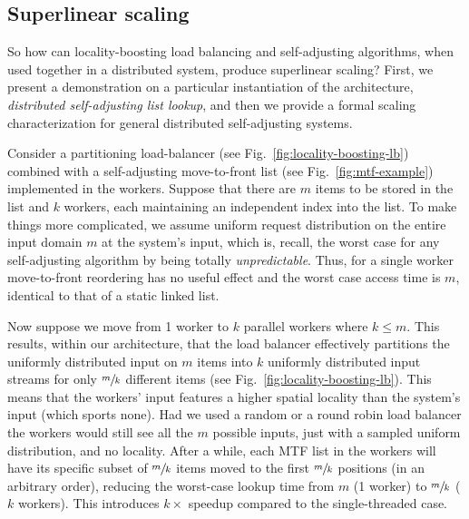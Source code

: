
\subsection{Superlinear scaling}
\label{sec:arch-scaling}

So how can locality-boosting load balancing and self-adjusting algorithms, when used together in a distributed system, produce superlinear scaling? First, we present a demonstration on a particular instantiation of the architecture, \emph{distributed self-adjusting list lookup}, and then we provide a formal scaling characterization for general distributed self-adjusting systems.

Consider a partitioning load-balancer (see Fig.~\ref{fig:locality-boosting-lb}) combined with a self-adjusting move-to-front list (see Fig.~\ref{fig:mtf-example}) implemented in the workers. Suppose that there are $m$ items to be stored in the list and $k$ workers, each maintaining an independent index into the list. To make things more complicated, we assume uniform request distribution on the entire input domain $m$ at the system's input, which is, recall, the worst case for any self-adjusting algorithm by being totally \emph{unpredictable}. Thus, for a single worker move-to-front reordering has no useful effect and the worst case access time is $m$, identical to that of a static linked list.

Now suppose we move from 1 worker to $k$ parallel workers where $k \le m$. This results, within our architecture, that the load balancer effectively partitions the uniformly distributed input on $m$ items into $k$ uniformly distributed input streams for only $\sfrac{m}{k}$ different items (see Fig.~\ref{fig:locality-boosting-lb}). This means that the workers' input features a higher spatial locality than the system's input (which sports none).  Had we used a random or a round robin load balancer the workers would still see all the $m$ possible inputs, just with a sampled uniform distribution, and no locality. After a while, each MTF list in the workers will have its specific subset of $\sfrac{m}{k}$ items moved to the first $\sfrac{m}{k}$ positions (in an arbitrary order), reducing the worst-case lookup time from $m$ (1 worker) to $\sfrac{m}{k}$ ($k$ workers). This introduces $k\times$ speedup compared to the single-threaded case.

